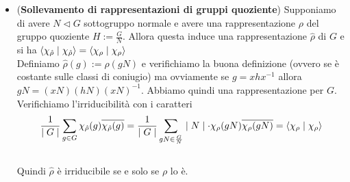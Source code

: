 \documentclass[a4paper,NoNotes,GeneralMath]{stdmdoc}
\newcommand{\nrm}{\lhd}
\begin{document}
\begin{itemize}
		\item ({\bf Sollevamento di rappresentazioni di gruppi quoziente}) Supponiamo di avere $N \nrm G$ sottogruppo normale e avere una rappresentazione $\rho$ del gruppo quoziente $H := \frac{G}{N}$. Allora questa induce una rappresentazione $\hat\rho$ di $G$ e si ha $\langle \chi_{\hat\rho} \mid \chi_{\hat\rho} \rangle = \langle \chi_\rho \mid \chi_\rho \rangle$ \\
		Definiamo $\hat\rho(g) := \rho(gN)$ e verifichiamo la buona definizione (ovvero se è costante sulle classi di coniugio) ma ovviamente se $g = xhx^{-1}$ allora $gN = (xN)(hN)(xN)^{-1}$. Abbiamo quindi una rappresentazione per $G$. Verifichiamo l'irriducibilità con i caratteri $$\frac{1}{\mid G \mid} \sum_{g \in G} \chi_{\hat\rho}(g) \overline{\chi_{\hat\rho}(g)} = \frac{1}{\mid G \mid} \sum_{gN \in \frac{G}{N}} \mid N \mid \cdot \chi_\rho(gN) \overline{\chi_\rho(gN)} = \langle \chi_\rho \mid \chi_\rho \rangle $$ \\
		Quindi $\hat\rho$ è irriducibile se e solo se $\rho$ lo è.


\end{itemize}
\end{document}
